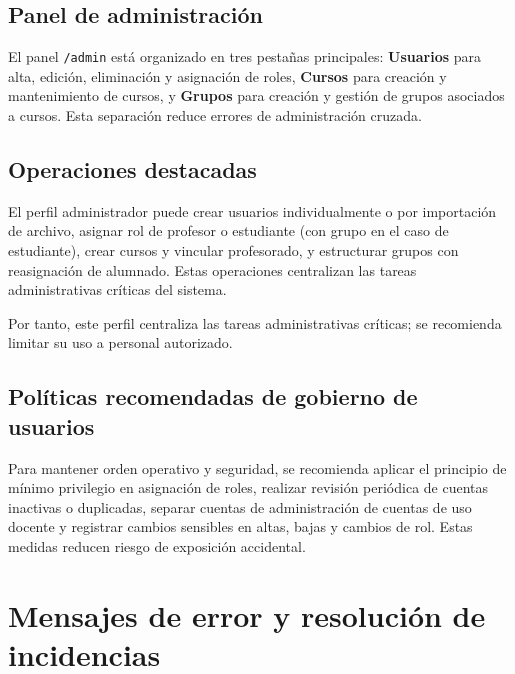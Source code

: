 

\FloatBarrier

\subsection{Panel de administraci\'on}

El panel \texttt{/admin} est\'a organizado en tres pesta\~nas principales: \textbf{Usuarios} para alta, edici\'on, eliminaci\'on y asignaci\'on de roles, \textbf{Cursos} para creaci\'on y mantenimiento de cursos, y \textbf{Grupos} para creaci\'on y gesti\'on de grupos asociados a cursos. Esta separaci\'on reduce errores de administraci\'on cruzada.

\subsection{Operaciones destacadas}

El perfil administrador puede crear usuarios individualmente o por importaci\'on de archivo, asignar rol de profesor o estudiante (con grupo en el caso de estudiante), crear cursos y vincular profesorado, y estructurar grupos con reasignaci\'on de alumnado. Estas operaciones centralizan las tareas administrativas cr\'iticas del sistema.

Por tanto, este perfil centraliza las tareas administrativas cr\'iticas; se recomienda limitar su uso a personal autorizado.

\subsection{Pol\'iticas recomendadas de gobierno de usuarios}

Para mantener orden operativo y seguridad, se recomienda aplicar el principio de m\'inimo privilegio en asignaci\'on de roles, realizar revisi\'on peri\'odica de cuentas inactivas o duplicadas, separar cuentas de administraci\'on de cuentas de uso docente y registrar cambios sensibles en altas, bajas y cambios de rol. Estas medidas reducen riesgo de exposici\'on accidental.

\FloatBarrier
\section{Mensajes de error y resoluci\'on de incidencias}

